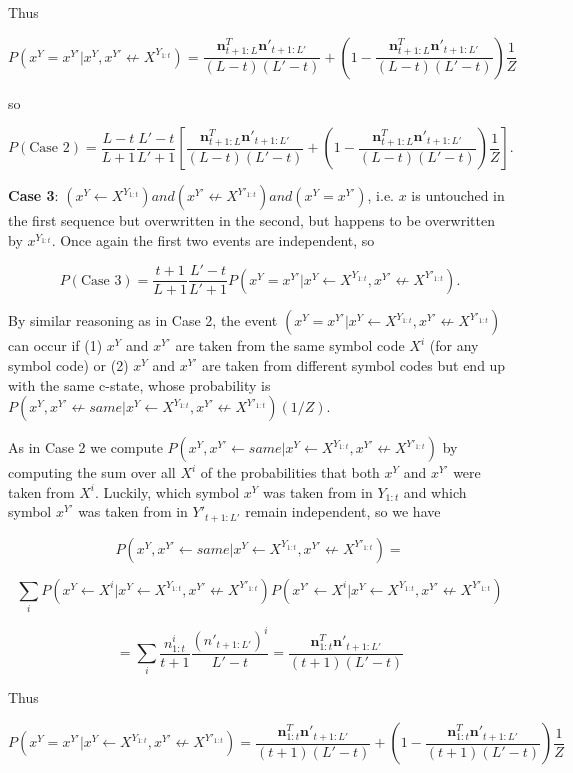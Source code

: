\documentclass{article}
\begin{document}
Thus

$$P(x^Y = x^{Y'}|x^Y, x^{Y'} \not\leftarrow X^{Y_{1:t}}) = \frac{\mathbf{n}^T_{t+1:L}\mathbf{n}'_{t+1:L'}}{(L-t)(L'-t)} + \left(1 - \frac{\mathbf{n}^T_{t+1:L}\mathbf{n}'_{t+1:L'}}{(L-t)(L'-t)} \right)\frac{1}{Z}$$

so

$$P(\textrm{Case 2}) = \frac{L-t}{L+1}\frac{L'-t}{L'+1}\left[\frac{\mathbf{n}^T_{t+1:L}\mathbf{n}'_{t+1:L'}}{(L-t)(L'-t)} + \left(1 - \frac{\mathbf{n}^T_{t+1:L}\mathbf{n}'_{t+1:L'}}{(L-t)(L'-t)} \right)\frac{1}{Z}\right].$$

\textbf{Case 3}: $(x^Y \leftarrow X^{Y_{1:t}}) and (x^{Y'} \not\leftarrow X^{Y'_{1:t}}) and (x^Y = x^{Y'})$, i.e. $x$ is untouched in the first sequence but overwritten in the second, but happens to be overwritten by $x^{Y_{1:t}}$. Once again the first two events are independent, so 

$$P(\textrm{Case 3}) = \frac{t+1}{L+1}\frac{L'-t}{L'+1}P(x^Y = x^{Y'}|x^Y \leftarrow X^{Y_{1:t}}, x^{Y'} \not\leftarrow X^{Y'_{1:t}}).$$

By similar reasoning as in Case 2, the event $(x^Y = x^{Y'}|x^Y \leftarrow X^{Y_{1:t}}, x^{Y'} \not\leftarrow X^{Y'_{1:t}})$ can occur if (1) $x^Y$ and $x^{Y'}$ are taken from the same symbol code $X^i$ (for any symbol code) or (2) $x^Y$ and $x^{Y'}$ are taken from different symbol codes but end up with the same c-state, whose probability is $P(x^Y, x^{Y'} \not\leftarrow same|x^Y \leftarrow X^{Y_{1:t}}, x^{Y'} \not\leftarrow X^{Y'_{1:t}})(1/Z)$.

As in Case 2 we compute $P(x^Y, x^{Y'} \leftarrow same|x^Y \leftarrow X^{Y_{1:t}}, x^{Y'} \not\leftarrow X^{Y'_{1:t}})$ by computing the sum over all $X^i$ of the probabilities that both $x^Y$ and $x^{Y'}$ were taken from $X^i$. Luckily, which symbol $x^Y$ was taken from in $Y_{1:t}$ and which symbol $x^{Y'}$ was taken from in $Y'_{t+1:L'}$ remain independent, so we have

$$P(x^Y, x^{Y'} \leftarrow same|x^Y \leftarrow X^{Y_{1:t}}, x^{Y'} \not\leftarrow X^{Y'_{1:t}}) = $$

$$\sum_i P(x^Y \leftarrow X^i|x^Y \leftarrow X^{Y_{1:t}}, x^{Y'} \not\leftarrow X^{Y'_{1:t}})P(x^{Y'} \leftarrow X^i|x^Y \leftarrow X^{Y_{1:t}}, x^{Y'} \not\leftarrow X^{Y'_{1:t}})$$

$$= \sum_i \frac{n^i_{1:t}}{t+1} \frac{(n'_{t+1:L'})^i}{L'-t} = \frac{\mathbf{n}^T_{1:t}\mathbf{n}'_{t+1:L'}}{(t+1)(L'-t)}$$

Thus

$$P(x^Y = x^{Y'}|x^Y \leftarrow X^{Y_{1:t}}, x^{Y'} \not\leftarrow X^{Y'_{1:t}}) = \frac{\mathbf{n}^T_{1:t}\mathbf{n}'_{t+1:L'}}{(t+1)(L'-t)} + \left(1 - \frac{\mathbf{n}^T_{1:t}\mathbf{n}'_{t+1:L'}}{(t+1)(L'-t)}\right)\frac{1}{Z}$$
\end{document}
